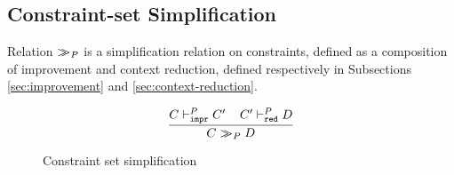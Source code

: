 \subsection{Constraint-set Simplification}

Relation $>\!\!\!>_{P}$ is a simplification relation on
cons\-traints, defined as a composition of improvement and context
reduction, defined respectively in Subsections \ref{sec:improvement}
and \ref{sec:context-reduction}.

\begin{figure}
   \[ \displaystyle \frac
        {C \vdash_{\texttt{impr}}^{P} C' \hspace*{.4cm} C' \vdash_{\texttt{red}}^{P} D}
        {C >\!\!\!>_{P} D}
  \]
\caption{Constraint set simplification}
\label{fig:constraint-set-simplification}
\end{figure}



